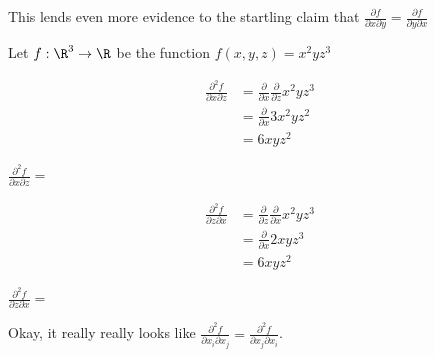 \documentclass{ximera}
\begin{document}
\begin{question}
		This lends even more evidence to the startling claim that $\frac{\partial f}{\partial x \partial y} = \frac{\partial f}{\partial y \partial x}$
	\end{question}
	
	\begin{question}
		Let $f:\R^3 \to \R$ be the function $f(x,y,z) = x^2yz^3$
		\begin{solution}
			\begin{hint}
				\begin{align*}
					\frac{\partial^2 f}{\partial x \partial z} &= \frac{\partial }{ \partial x} \frac{\partial}{ \partial z} x^2yz^3\\
						&=\frac{\partial }{ \partial x} 3x^2yz^2\\
						&= 6xyz^2
				\end{align*}
			\end{hint}
			$\frac{\partial^2 f}{\partial x \partial z} = $
		\end{solution}
		\begin{solution}
		\begin{hint}
				\begin{align*}
					\frac{\partial^2 f}{\partial z \partial x} &= \frac{\partial }{ \partial z} \frac{\partial}{ \partial x} x^2yz^3\\
						&=\frac{\partial }{ \partial x} 2xyz^3\\
						&= 6xyz^2
				\end{align*}
			\end{hint}
			$\frac{\partial^2 f}{\partial z \partial x} = $\answer{6xyz^2}
		\end{solution}
		
		Okay, it really really looks like $\frac{\partial^2 f}{\partial x_i \partial x_j} = \frac{\partial^2 f}{\partial x_j \partial x_i} $.
		\end{question}
	
\end{document}
